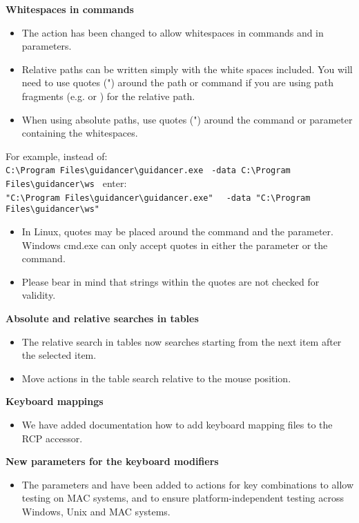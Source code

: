 \documentclass[en,a4paper,twoside,manual,guidancer]{bxreport}
\begin{document}
\textbf{Whitespaces in commands}
\begin{itemize}
\item The action  has been changed to allow whitespaces in commands and in parameters. 
\item Relative paths can be written simply with the white spaces included. You will need to use quotes (") around the path or command if you are using path fragments (e.g.  or ) for the relative path.  
\item When using absolute paths, use quotes (") around the command or parameter containing the whitespaces. 

\end{itemize}
For example, instead of: \\
\verb+C:\Program Files\guidancer\guidancer.exe +
\newline
\verb+-data C:\Program Files\guidancer\ws +
\newline
enter:\\
\verb+"C:\Program Files\guidancer\guidancer.exe" +
\newline
\verb+ -data "C:\Program Files\guidancer\ws" +
\begin{itemize}
\item In Linux, quotes may be placed around the command and the parameter. Windows cmd.exe can only accept quotes in either the parameter or the command. 
\item Please bear in mind that strings within the quotes are not checked for validity. 

\end{itemize}

\textbf{Absolute and relative searches in tables}
\begin{itemize}
\item The relative search in tables now searches starting from the next item after the selected item.
\item Move actions in the table search relative to the mouse position. 
\end{itemize}

\textbf{Keyboard mappings}
\begin{itemize}
\item We have added documentation how to add keyboard mapping files to the RCP accessor. 
\end{itemize}

\textbf{New parameters for the keyboard modifiers}
\begin{itemize}
\item The parameters  and  have been added to actions for key combinations to allow testing on MAC systems, and to ensure platform-independent testing across Windows, Unix and MAC systems.
\end{itemize}
\end{document}
